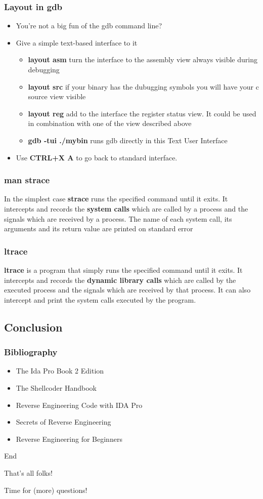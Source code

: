 \documentclass[]{beamer}
\begin{document}
\begin{frame}
  \frametitle{Layout in gdb}
  \begin{itemize}
  \item{You're not a big fun of the gdb command line?}
  \item{Give a simple text-based interface to it}
    \begin{itemize}
    \item{{\bf layout asm} turn the interface to the assembly view always visible during debugging}
    \item{{\bf layout src} if your binary has the dubugging symbols you will have your c source view visible}
    \item{{\bf layout reg} add to the interface the register status view. It could be used in combination with one of the view described above}
    \item{{\bf gdb -tui ./mybin} runs gdb directly in this Text User Interface}
    \end{itemize}
  \item{Use {\bf CTRL+X A} to go back to standard interface.}
  \end{itemize}
\end{frame}

\begin{frame}
  \frametitle{man strace}
       In  the  simplest  case  {\bf strace}  runs the specified command until it exits.  It intercepts and
       records the {\bf system calls} which are called by a process and the signals which are received by a
       process.   The  name  of  each  system call, its arguments and its return value are printed on
       standard error
\end{frame}

\begin{frame}
  \frametitle{ltrace}
       {\bf ltrace}  is a program that simply runs the specified command until it exits.  It intercepts and
       records the {\bf dynamic library calls} which are called by the executed  process  and  the  signals
       which are received by that process.  It can also intercept and print the system calls executed
       by the program.

\end{frame}

\subsection{Conclusion}
\begin{frame}
  \frametitle{Bibliography}
  \begin{itemize}
  \item The Ida Pro Book 2 Edition
  \item The Shellcoder Handbook
  \item Reverse Engineering Code with IDA Pro
  \item Secrets of Reverse Engineering
  \item Reverse Engineering for Beginners
  \end{itemize}
\end{frame}

\begin{frame}{End}
  \begin{center}\Large
    That's all folks!

    Time for (more) questions!
  \end{center}
\end{frame}
\end{document}
